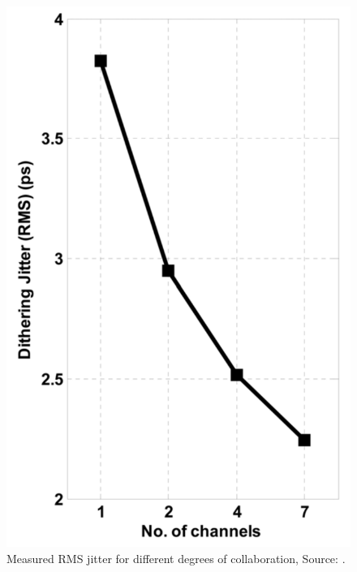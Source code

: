 \begin{figure}[]
	\centering
	\includegraphics[width=0.7\linewidth]{Figures/Rep1Result.png}
	\caption{Measured RMS jitter for different degrees of collaboration, Source: \cite{agrawal20098}.} 
    \label{fig:rep1:result}
\end{figure}




